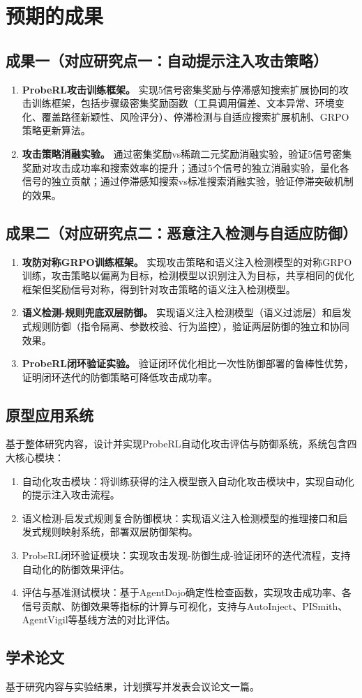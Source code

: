 \section{预期的成果}

\subsection{成果一（对应研究点一：自动提示注入攻击策略）}
\begin{enumerate}
  \item \textbf{ProbeRL攻击训练框架。} 实现5信号密集奖励与停滞感知搜索扩展协同的攻击训练框架，包括步骤级密集奖励函数（工具调用偏差、文本异常、环境变化、覆盖路径新颖性、风险评分）、停滞检测与自适应搜索扩展机制、GRPO策略更新算法。
  \item \textbf{攻击策略消融实验。} 通过密集奖励vs稀疏二元奖励消融实验，验证5信号密集奖励对攻击成功率和搜索效率的提升；通过5个信号的独立消融实验，量化各信号的独立贡献；通过停滞感知搜索vs标准搜索消融实验，验证停滞突破机制的效果。
\end{enumerate}

\subsection{成果二（对应研究点二：恶意注入检测与自适应防御）}
\begin{enumerate}
  \item \textbf{攻防对称GRPO训练框架。} 实现攻击策略和语义注入检测模型的对称GRPO训练，攻击策略以偏离为目标，检测模型以识别注入为目标，共享相同的优化框架但奖励信号对称，得到针对攻击策略的语义注入检测模型。
  \item \textbf{语义检测-规则兜底双层防御。} 实现语义注入检测模型（语义过滤层）和启发式规则防御（指令隔离、参数校验、行为监控），验证两层防御的独立和协同效果。
  \item \textbf{ProbeRL闭环验证实验。} 验证闭环优化相比一次性防御部署的鲁棒性优势，证明闭环迭代的防御策略可降低攻击成功率。
\end{enumerate}


\subsection{原型应用系统}
基于整体研究内容，设计并实现ProbeRL自动化攻击评估与防御系统，系统包含四大核心模块：
\begin{enumerate}
  \item 自动化攻击模块：将训练获得的注入模型嵌入自动化攻击模块中，实现自动化的提示注入攻击流程。
  \item 语义检测-启发式规则复合防御模块：实现语义注入检测模型的推理接口和启发式规则映射系统，部署双层防御架构。
  \item ProbeRL闭环验证模块：实现攻击发现-防御生成-验证闭环的迭代流程，支持自动化的防御效果评估。
  \item 评估与基准测试模块：基于AgentDojo确定性检查函数，实现攻击成功率、各信号贡献、防御效果等指标的计算与可视化，支持与AutoInject、PISmith、AgentVigil等基线方法的对比评估。
\end{enumerate}

\subsection{学术论文}
基于研究内容与实验结果，计划撰写并发表会议论文一篇。
